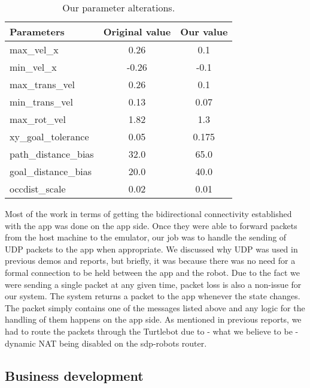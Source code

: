 \documentclass{article}
\begin{document}
\begin{table}[h]
\vskip 3mm
\begin{center}
\begin{small}
\begin{sc}
\begin{tabular}{lcc}
\hline
\abovespace\belowspace
Parameters & Original value & Our value \\
\hline
  max\_vel\_x & 0.26 & 0.1 \\
  min\_vel\_x & -0.26 & -0.1 \\
  max\_trans\_vel & 0.26 & 0.1 \\
  min\_trans\_vel & 0.13 & 0.07 \\
  max\_rot\_vel & 1.82 & 1.3 \\
  xy\_goal\_tolerance & 0.05 & 0.175 \\
  path\_distance\_bias & 32.0 & 65.0 \\
  goal\_distance\_bias & 20.0 & 40.0 \\
  occdist\_scale & 0.02 & 0.01
\end{tabular}
\end{sc}
\end{small}
\caption{Our parameter alterations.}
\label{tab:params}
\end{center}
\vskip -3mm
\end{table}


Most of the work in terms of getting the bidirectional connectivity established with the app was done on the app side. Once they were able to forward packets from the host machine to the emulator, our job was to handle the sending of UDP packets to the app when appropriate. We discussed why UDP was used in previous demos and reports, but briefly, it was because there was no need for a formal connection to be held between the app and the robot. Due to the fact we were sending a single packet at any given time, packet loss is also a non-issue for our system. The system returns a packet to the app whenever the state changes. The packet simply contains one of the messages listed above and any logic for the handling of them happens on the app side. As mentioned in previous reports, we had to route the packets through the Turtlebot due to - what we believe to be - dynamic NAT being disabled on the sdp-robots router.

\subsection{Business development}
\end{document}
